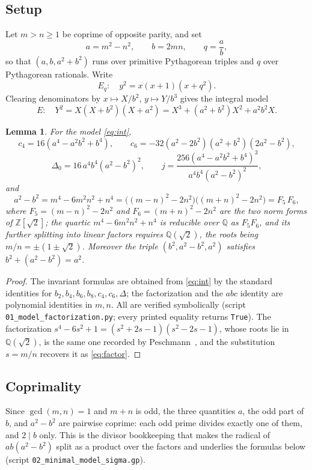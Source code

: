 \documentclass[11pt,reqno]{amsart}
\theoremstyle{plain}
\newtheorem{lemma}[theorem]{Lemma}
\theoremstyle{definition}
\newcommand{\Q}{\mathbb{Q}}
\newcommand{\Z}{\mathbb{Z}}
\begin{document}
\subsection{Setup}
Let $m>n\ge1$ be coprime of opposite parity, and set
\begin{equation}\label{eq:ab}
  a=m^2-n^2,\qquad b=2mn,\qquad q=\frac{a}{b},
\end{equation}
so that $(a,b,a^2+b^2)$ runs over primitive Pythagorean triples and $q$ over
Pythagorean rationals. Write
\begin{equation}\label{eq:Eq}
  E_q\colon\quad y^2=x(x+1)(x+q^2).
\end{equation}
Clearing denominators by $x\mapsto X/b^2$, $y\mapsto Y/b^3$ gives the integral
model
\begin{equation}\label{eq:int}
  E\colon\quad Y^2=X(X+b^2)(X+a^2)=X^3+(a^2+b^2)X^2+a^2b^2X.
\end{equation}

\begin{lemma}\label{lem:inv}
For the model \eqref{eq:int},
\[
  c_4=16(a^4-a^2b^2+b^4),\qquad
  c_6=-32(a^2-2b^2)(a^2+b^2)(2a^2-b^2),
\]
\[
  \Delta_0=16\,a^4b^4(a^2-b^2)^2,\qquad
  j=\frac{256(a^4-a^2b^2+b^4)^3}{a^4b^4(a^2-b^2)^2},
\]
and
\begin{equation}\label{eq:factor}
  a^2-b^2=m^4-6m^2n^2+n^4=\bigl((m-n)^2-2n^2\bigr)\bigl((m+n)^2-2n^2\bigr)
  =F_5\,F_6,
\end{equation}
where $F_5=(m-n)^2-2n^2$ and $F_6=(m+n)^2-2n^2$ are the two norm forms of
$\Z[\sqrt2]$; the quartic $m^4-6m^2n^2+n^4$ is reducible over $\Q$ as $F_5F_6$,
and its further splitting into linear factors requires $\Q(\sqrt2)$, the roots
being $m/n=\pm(1\pm\sqrt2)$. Moreover the triple
$(b^2,a^2-b^2,a^2)$ satisfies $b^2+(a^2-b^2)=a^2$.
\end{lemma}

\begin{proof}
The invariant formulas are obtained from \eqref{eq:int} by the standard
identities for $b_2,b_4,b_6,b_8,c_4,c_6,\Delta$; the factorization and the
$abc$ identity are polynomial identities in $m,n$. All are verified symbolically
(script \texttt{01\_model\_factorization.py}; every printed equality returns
\texttt{True}). The factorization $s^4-6s^2+1=(s^2+2s-1)(s^2-2s-1)$, whose roots
lie in $\Q(\sqrt2)$, is the same one recorded by Peschmann~\cite{peschmann}, and
the substitution $s=m/n$ recovers it as \eqref{eq:factor}.
\end{proof}

\subsection{Coprimality}
Since $\gcd(m,n)=1$ and $m+n$ is odd, the three quantities $a$, the odd part of
$b$, and $a^2-b^2$ are pairwise coprime: each odd prime divides exactly one of
them, and $2\mid b$ only. This is the divisor bookkeeping that makes the radical
of $ab(a^2-b^2)$ split as a product over the factors and underlies the formulas
below (script \texttt{02\_minimal\_model\_sigma.gp}).
\end{document}
